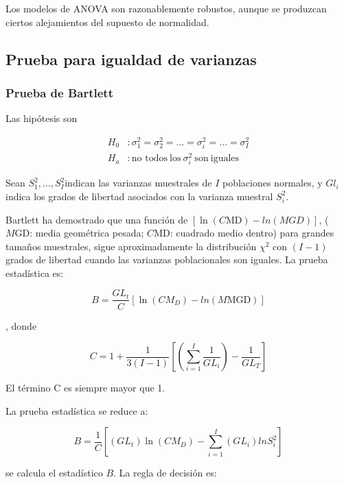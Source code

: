 \documentclass[]{book}
\theoremstyle{definition}
\theoremstyle{definition}
\theoremstyle{definition}
\theoremstyle{remark}
\begin{document}
Los modelos de ANOVA son razonablemente robustos, aunque se produzcan
ciertos alejamientos del supuesto de normalidad.

\hypertarget{prueba-para-igualdad-de-varianzas}{%
\subsection{Prueba para igualdad de
varianzas}\label{prueba-para-igualdad-de-varianzas}}

\hypertarget{prueba-de-bartlett}{%
\subsubsection{Prueba de Bartlett}\label{prueba-de-bartlett}}

Las hipótesis son

\[
\begin{aligned}
 H_{0} &: \sigma_{1}^{2} = \sigma_{2}^{2} = \ldots = \sigma_{i}^{2} = \ldots = \sigma_{I}^{2} \\
 H_{a} &: \text{no todos}\ \text{los}\ \sigma_{i}^{2}\ \text{son}\ \text{iguales}
\end{aligned}
\]

Sean \(S_{1}^{2},\ldots,S_{I}^{2}\)indican las varianzas muestrales de
\(I\) poblaciones normales, y \(Gl_{i}\) indica los grados de libertad
asociados con la varianza muestral \(S_{i}^{2}\).

Bartlett ha demostrado que una función de
\(\left\lbrack \ln\left( C\text{MD} \right) - ln(MGD) \right\rbrack\),
(\(M\text{GD}\): media geométrica pesada; \(C\text{MD}\): cuadrado medio
dentro) para grandes tamaños muestrales, sigue aproximadamente la
distribución \(\chi^{2}\) con \((I-1)\) grados de libertad cuando las
varianzas poblacionales son iguales. La prueba estadística es:

\[
B = \frac{GL_{t}}{C}\left\lbrack \ln\left( CM_D \right) - ln(M\text{MGD}) \right\rbrack
\]

, donde

\[
C = 1 + \frac{1}{3\left( I - 1 \right)}\left\lbrack \left( \sum_{i = 1}^{I}\frac{1}{GL_{i}} \right) - \frac{1}{GL_{T}} \right\rbrack
\]

El término C es siempre mayor que 1.

La prueba estadística se reduce a:

\[
B = \frac{1}{C}\left\lbrack (GL_{t})\ln\left( CM_D \right) - \sum_{i = 1}^{I}\left( GL_{i} \right)lnS_{i}^{2} \right\rbrack
\]

se calcula el estadístico \(B\). La regla de decisión es:
\end{document}
